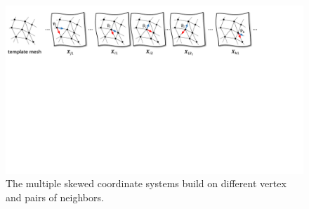 \begin{figure}
    \centering
    \includegraphics[width=1\linewidth]{chapter3/tex/figures/active_model_K_sum.pdf}
    \caption{\small The multiple skewed coordinate systems build on different vertex and pairs of neighbors.}
    \label{ch3:fig:sum_coords}
\end{figure}